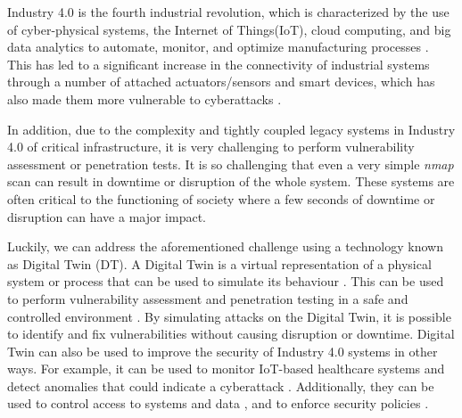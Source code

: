 


Industry 4.0 is the fourth industrial revolution, which is characterized by the use of cyber-physical systems, the Internet of Things(IoT),  cloud computing, and big data analytics to automate, monitor, and optimize manufacturing processes \cite{abikoye_application_2021}. This has led to a significant increase in the connectivity of industrial systems through a number of attached actuators/sensors and smart devices, which has also made them more vulnerable to cyberattacks \cite{sousaELEGANTSecurityCritical2021}.

In addition, due to the complexity and tightly coupled legacy systems in Industry 4.0 of critical infrastructure, it is very challenging to perform vulnerability assessment or penetration tests. It is so challenging that even a very simple \textit{nmap} scan can result in downtime or disruption of the whole system. These systems are often critical to the functioning of society where a few seconds of downtime or disruption can have a major impact.


Luckily, we can address the aforementioned challenge using a technology known as Digital Twin (DT). A Digital Twin is a virtual representation of a physical system or process that can be used to simulate its behaviour \cite{eckhartEnhancingCyberSituational2019}. This can be used to perform vulnerability assessment and penetration testing in a safe and controlled environment \cite{sousaELEGANTSecurityCritical2021}. By simulating attacks on the Digital Twin, it is possible to identify and fix vulnerabilities without causing disruption or downtime. Digital Twin can also be used to improve the security of Industry 4.0 systems in other ways. For example, it can be used to monitor IoT-based healthcare systems \cite{pirbhulalNovelFrameworkReinforcing2022} and detect anomalies that could indicate a cyberattack \cite{saadImplementationIoTBasedDigital2020, chukkapalliCyberPhysicalSystemSecurity2021}. Additionally, they can be used to control access to systems and data \cite{glenandbensonjamesandguptamaanakandsandhuravicatheyEdgeCentricSecure2021}, and to enforce security policies \cite{giovannipaolosellittoEnablingZeroTrust2021}.

